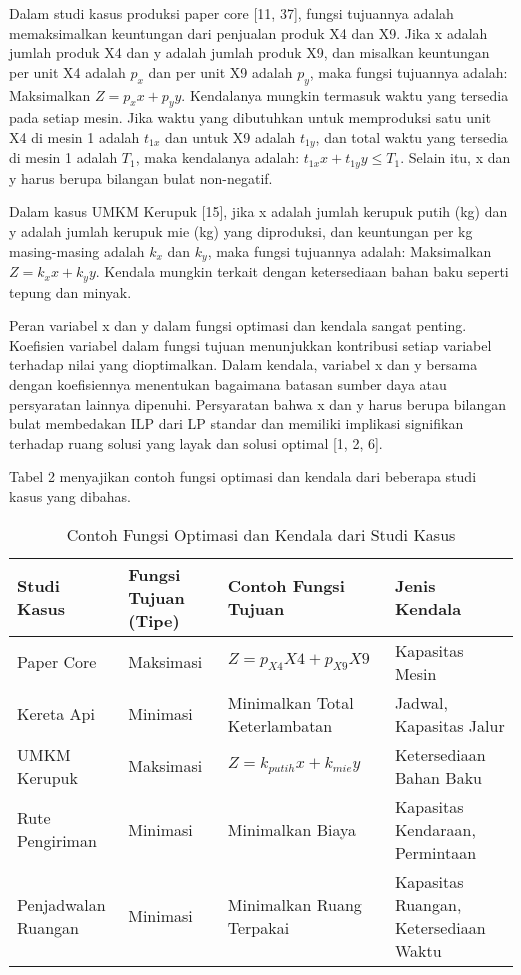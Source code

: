 \documentclass{IEEEtran}
\begin{document}
Dalam studi kasus produksi paper core [11, 37], fungsi tujuannya adalah memaksimalkan keuntungan dari penjualan produk X4 dan X9. Jika x adalah jumlah produk X4 dan y adalah jumlah produk X9, dan misalkan keuntungan per unit X4 adalah $p_x$ dan per unit X9 adalah $p_y$, maka fungsi tujuannya adalah: Maksimalkan $Z = p_x x + p_y y$. Kendalanya mungkin termasuk waktu yang tersedia pada setiap mesin. Jika waktu yang dibutuhkan untuk memproduksi satu unit X4 di mesin 1 adalah $t_{1x}$ dan untuk X9 adalah $t_{1y}$, dan total waktu yang tersedia di mesin 1 adalah $T_1$, maka kendalanya adalah: $t_{1x} x + t_{1y} y \leq T_1$. Selain itu, x dan y harus berupa bilangan bulat non-negatif.

Dalam kasus UMKM Kerupuk [15], jika x adalah jumlah kerupuk putih (kg) dan y adalah jumlah kerupuk mie (kg) yang diproduksi, dan keuntungan per kg masing-masing adalah $k_x$ dan $k_y$, maka fungsi tujuannya adalah: Maksimalkan $Z = k_x x + k_y y$. Kendala mungkin terkait dengan ketersediaan bahan baku seperti tepung dan minyak.

Peran variabel x dan y dalam fungsi optimasi dan kendala sangat penting. Koefisien variabel dalam fungsi tujuan menunjukkan kontribusi setiap variabel terhadap nilai yang dioptimalkan. Dalam kendala, variabel x dan y bersama dengan koefisiennya menentukan bagaimana batasan sumber daya atau persyaratan lainnya dipenuhi. Persyaratan bahwa x dan y harus berupa bilangan bulat membedakan ILP dari LP standar dan memiliki implikasi signifikan terhadap ruang solusi yang layak dan solusi optimal [1, 2, 6].

Tabel 2 menyajikan contoh fungsi optimasi dan kendala dari beberapa studi kasus yang dibahas.

\begin{table}[h!]
    \centering
    \caption{Contoh Fungsi Optimasi dan Kendala dari Studi Kasus}
    \label{tab:objective_constraints}
    \begin{tabular}{@{}llll@{}}
        \toprule
        Studi Kasus & Fungsi Tujuan (Tipe) & Contoh Fungsi Tujuan & Jenis Kendala \\
        \midrule
        Paper Core & Maksimasi & $Z = p_{X4} X4 + p_{X9} X9$ & Kapasitas Mesin \\
        Kereta Api & Minimasi & Minimalkan Total Keterlambatan & Jadwal, Kapasitas Jalur \\
        UMKM Kerupuk & Maksimasi & $Z = k_{putih} x + k_{mie} y$ & Ketersediaan Bahan Baku \\
        Rute Pengiriman & Minimasi & Minimalkan Biaya & Kapasitas Kendaraan, Permintaan \\
        Penjadwalan Ruangan & Minimasi & Minimalkan Ruang Terpakai & Kapasitas Ruangan, Ketersediaan Waktu \\
        \bottomrule
    \end{tabular}
\end{table}
\end{document}
